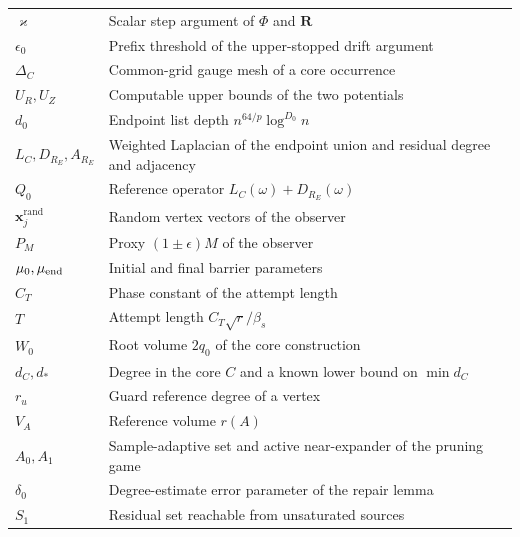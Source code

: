 \documentclass[11pt]{article}
\theoremstyle{remark}
\newcommand{\xxrand}{\mathbf{x}^{\mathrm{rand}}}
\newcommand{\RR}{\mathbf R}
\begin{document}
\begin{longtable}{@{}p{}p{}@{}}
$\varkappa$ & Scalar step argument of $\Phi$ and $\RR$ \\
$\epsilon_0$ & Prefix threshold of the upper-stopped drift argument \\
$\Delta_C$ & Common-grid gauge mesh of a core occurrence \\
$U_R,U_Z$ & Computable upper bounds of the two potentials \\
$d_0$ & Endpoint list depth $n^{64/p}\log^{D_0}n$ \\
$L_C,D_{R_E},A_{R_E}$ & Weighted Laplacian of the endpoint union and residual degree and adjacency \\
$Q_0$ & Reference operator $L_C(\omega)+D_{R_E}(\omega)$ \\
$\xxrand_j$ & Random vertex vectors of the observer \\
$P_M$ & Proxy $(1\pm\epsilon)M$ of the observer \\
$\mu_0,\mu_{\rm end}$ & Initial and final barrier parameters \\
$C_T$ & Phase constant of the attempt length \\
$T$ & Attempt length $C_T\sqrt r/\beta_s$ \\
$W_0$ & Root volume $2q_0$ of the core construction \\
$d_C,d_*$ & Degree in the core $C$ and a known lower bound on $\min d_C$ \\
$r_u$ & Guard reference degree of a vertex \\
$V_A$ & Reference volume $r(A)$ \\
$A_0,A_1$ & Sample-adaptive set and active near-expander of the pruning game \\
$\delta_0$ & Degree-estimate error parameter of the repair lemma \\
$S_1$ & Residual set reachable from unsaturated sources \\
\end{longtable}
\end{document}
